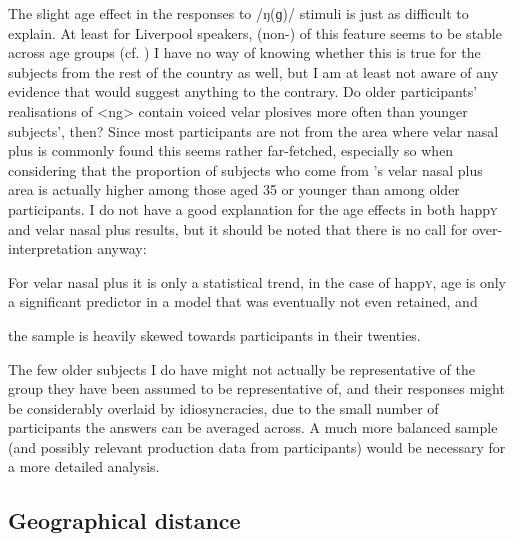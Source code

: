 The slight age effect in the responses to /ŋ(ɡ)/ stimuli is just as difficult to explain.
At least for Liverpool speakers, (non-) of this feature seems to be stable across age groups (cf. )
I have no way of knowing whether this is true for the subjects from the rest of the country as well, but I am at least not aware of any evidence that would suggest anything to the contrary.
Do older participants' realisations of <ng> contain voiced velar plosives more often than younger subjects', then?
Since most participants are not from the area where velar nasal plus is commonly found this seems rather far-fetched, especially so when considering that the proportion of subjects who come from \citeauthor{trudgill1999}'s \citeyear{trudgill1999} velar nasal plus area is actually higher among those aged 35 or younger than among older participants.
I do not have a good explanation for the age effects in both happ\textsc{y} and velar nasal plus results, but it should be noted that there is no call for over-interpretation anyway:
	\begin{inparaenum}[(a)]
		\item For velar nasal plus it is only a statistical trend, in the case of happ\textsc{y}, age is only a significant predictor in a model that was eventually not even retained, and
		\item the sample is heavily skewed towards participants in their twenties.
	\end{inparaenum}
The few older subjects I do have might not actually be representative of the group they have been assumed to be representative of, and their responses might be considerably overlaid by idiosyncracies, due to the small number of participants the answers can be averaged across.
A much more balanced sample (and possibly relevant production data from participants) would be necessary for a more detailed analysis.

		\subsection{Geographical distance}

